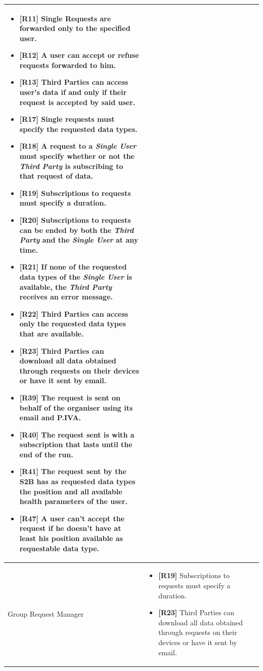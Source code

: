 \documentclass[titlepage]{article}
\begin{document}
\begin{longtable}{| p{5 cm} | p{8 cm} |}
\begin{itemize}
			\item {\bf [R11]} Single Requests are forwarded only to the specified user.
			\item {\bf [R12]} A user can accept or refuse requests forwarded to him. 
			\item {\bf [R13]} Third Parties can access user’s data if and only if their request is accepted by said user. 
			\item {\bf [R17]} Single requests must specify the requested data types. 
			\item {\bf [R18]} A request to a {\it Single User} must specify whether or not the {\it Third Party} is subscribing to that request of data.
			\item {\bf [R19]} Subscriptions to requests must specify a duration.
			\item {\bf [R20]} Subscriptions to requests can be ended by both the {\it Third Party} and the {\it Single User} at any time.
			\item {\bf [R21]} If none of the requested data types of the {\it Single User} is available, the {\it Third Party} receives an error message.
			\item {\bf [R22]} Third Parties can access only the requested data types that are available.
			\item {\bf [R23]} Third Parties can download all data obtained through requests on their devices or have it sent by email.
			\item {\bf [R39]} The request is sent on behalf of the organiser using its email and P.IVA.
			\item {\bf [R40]} The request sent is with a subscription that lasts until the end of the run.
			\item {\bf [R41]} The request sent by the S2B has as requested data types the position and all available health parameters of the user.
			\item {\bf [R47]} A user can’t accept the request if he doesn’t have at least his position available as requestable data type.
		\end{itemize}		
		\\	 \hline	
		\newline Group Request Manager & 
		\begin{itemize}
			\item {\bf [R19]} Subscriptions to requests must specify a duration.
			\item {\bf [R23]} Third Parties can download all data obtained through requests on their devices or have it sent by email.

\end{itemize}
\end{longtable}
\end{document}
